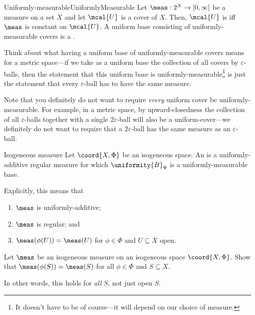 \begin{dfn}{Uniformly-measurable}{UniformlyMeasurable}
Let $\meas :2^X\rightarrow [0,\infty ]$ be a measure on a set $X$ and let $\mcal{U}$ is a cover of $X$.  Then, $\mcal{U}$ is  iff $\meas$ is constant on $\mcal{U}$.  A uniform base consisting of uniformly-measurable covers is a .
\begin{rmk}
Think about what having a uniform base of uniformly-measurable covers means for a metric space---if we take as a uniform base the collection of all covers by $\varepsilon$-balls, then the statement that this uniform base is uniformly-measurable\footnote{It doesn't have to be of course---it will depend on our choice of measure.} is just the statement that every $\varepsilon$-ball has to have the same measure.
\end{rmk}
\begin{rmk}
Note that you definitely do not want to require \emph{every} uniform cover be uniformly-measurable.  For example, in a metric space, by upward-closedness the collection of all $\varepsilon$-balls together with a single $2\varepsilon$-ball will also be a uniform-cover---we definitely do not want to require that a $2\varepsilon$-ball has the same measure as an $\varepsilon$-ball.
\end{rmk}
\end{dfn}
\begin{dfn}{Isogeneous measure}{}
Let $\coord{X,\Phi}$ be an isogeneous space.  An  is a uniformly-additive regular measure for which $\uniformity{B}_\Phi$ is a uniformly-measurable base.
\begin{rmk}
Explicitly, this means that
\begin{enumerate}
\item $\meas$ is uniformly-additive;
\item $\meas$ is regular; and
\item $\meas (\phi (U))=\meas (U)$ for $\phi \in \Phi$ and $U\subseteq X$ open.
\end{enumerate}
\end{rmk}
\end{dfn}
\begin{exr}{}{}
Let $\meas$ be an isogeneous measure on an isogeneous space $\coord{X,\Phi}$.  Show that $\meas (\phi (S))=\meas (S)$ for all $\phi \in \Phi$ and $S\subseteq X$.
\begin{rmk}
In other words, this holds for \emph{all} $S$, not just open $S$.
\end{rmk}
\end{exr}
